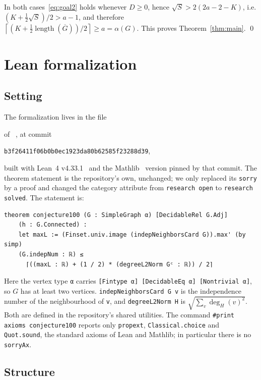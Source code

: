 \documentclass[11pt]{article}
\theoremstyle{definition}
\theoremstyle{remark}
\newcommand{\Gbar}{\overline{G}}
\newcommand{\lng}{\operatorname{length}}
\newcommand{\ceil}[1]{\left\lceil #1 \right\rceil}
\begin{document}
In both cases~\eqref{eq:goal2} holds whenever $D \ge 0$, hence
$\sqrt{S} > 2(2a - 2 - K)$, i.e.
$(K + \tfrac12\sqrt S)/2 > a - 1$, and therefore
$\ceil{(K + \tfrac12 \lng(\Gbar))/2} \ge a = \alpha(G)$. This proves
Theorem~\ref{thm:main}. \qed

\section{Lean formalization}

\subsection{Setting}

The formalization lives in the file
\begin{center}\small{}\end{center}
of ~\cite{fc}, at commit
\begin{center}\small\texttt{b3f26411f06b0b0ec1923da80b62585f23288d39},\end{center}
built with Lean~4
v4.33.1~\cite{lean4} and the Mathlib~\cite{mathlib} version pinned by that
commit. The theorem statement is the repository's own, unchanged; we only
replaced its \texttt{sorry} by a proof and changed the category attribute
from \texttt{research open} to \texttt{research solved}. The statement is:

\begin{Verbatim}
theorem conjecture100 (G : SimpleGraph α) [DecidableRel G.Adj]
    (h : G.Connected) :
    let maxL := (Finset.univ.image (indepNeighborsCard G)).max' (by simp)
    (G.indepNum : ℝ) ≤
      ⌈((maxL : ℝ) + (1 / 2) * (degreeL2Norm Gᶜ : ℝ)) / 2⌉
\end{Verbatim}

\noindent
Here the vertex type \texttt{α} carries \texttt{[Fintype α] [DecidableEq α]
[Nontrivial α]}, so $G$ has at least two vertices.
\texttt{indepNeighborsCard G v} is the independence number of the
neighbourhood of \texttt{v}, and \texttt{degreeL2Norm H} is
$\sqrt{\sum_v \deg_H(v)^2}$. Both are defined in the repository's shared
utilities. The command \texttt{\#print axioms conjecture100} reports only
\texttt{propext}, \texttt{Classical.choice} and \texttt{Quot.sound}, the
standard axioms of Lean and Mathlib; in particular there is no
\texttt{sorryAx}.

\subsection{Structure}
\end{document}
